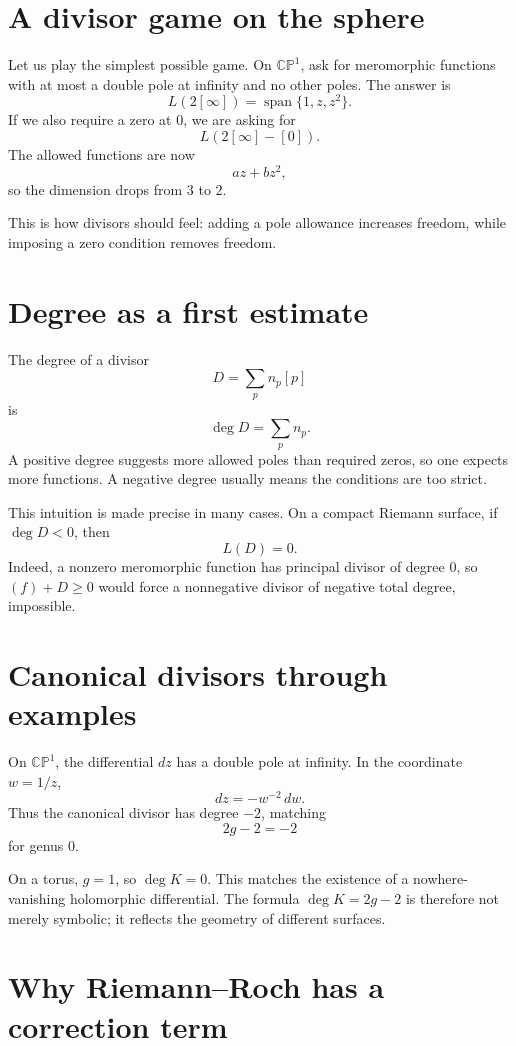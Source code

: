 
\section{A divisor game on the sphere}

Let us play the simplest possible game.  On \(\mathbb{CP}^1\), ask for meromorphic functions with at most a double pole at infinity and no other poles.  The answer is
\[
  L(2[\infty])=\operatorname{span}\{1,z,z^2\}.
\]
If we also require a zero at \(0\), we are asking for
\[
  L(2[\infty]-[0]).
\]
The allowed functions are now
\[
  az+bz^2,
\]
so the dimension drops from \(3\) to \(2\).

This is how divisors should feel: adding a pole allowance increases freedom, while imposing a zero condition removes freedom.

\section{Degree as a first estimate}

The degree of a divisor
\[
  D=\sum_p n_p[p]
\]
is
\[
  \deg D=\sum_p n_p.
\]
A positive degree suggests more allowed poles than required zeros, so one expects more functions.  A negative degree usually means the conditions are too strict.

This intuition is made precise in many cases.  On a compact Riemann surface, if \(\deg D<0\), then
\[
  L(D)=0.
\]
Indeed, a nonzero meromorphic function has principal divisor of degree \(0\), so \((f)+D\ge0\) would force a nonnegative divisor of negative total degree, impossible.

\section{Canonical divisors through examples}

On \(\mathbb{CP}^1\), the differential \(dz\) has a double pole at infinity.  In the coordinate \(w=1/z\),
\[
  dz=-w^{-2}\,dw.
\]
Thus the canonical divisor has degree \(-2\), matching
\[
  2g-2=-2
\]
for genus \(0\).

On a torus, \(g=1\), so \(\deg K=0\).  This matches the existence of a nowhere-vanishing holomorphic differential.  The formula \(\deg K=2g-2\) is therefore not merely symbolic; it reflects the geometry of different surfaces.

\section{Why Riemann--Roch has a correction term}

